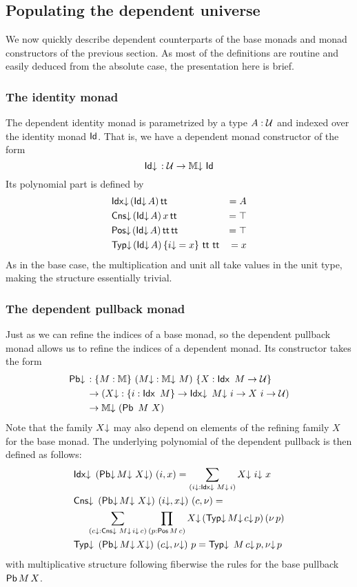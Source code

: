 \subsection{Populating the dependent universe}

We now quickly describe dependent counterparts of the base monads and
monad constructors of the previous section.  As most of the
definitions are routine and easily deduced from the absolute case, the
presentation here is brief.

\subsubsection{The identity monad}

The dependent identity monad is parametrized by a type $A : \mathcal{U}$ and
indexed over the identity monad $\mathsf{Id}$.  That is, we have a dependent
monad constructor of the form
\[
  \mathsf{Id{\downarrow}}\, : \mathcal{U} \to \mathbb{M{\downarrow}}\ \mathsf{Id} 
\]
Its polynomial part is defined by
\begin{align*}
  &\mathsf{Idx}{\downarrow}\, (\mathsf{Id{\downarrow}}\, A)\, \mathsf{tt} &= A\\
  &\mathsf{Cns}{\downarrow}\, (\mathsf{Id{\downarrow}}\, A)\, x\, \mathsf{tt} &= \top\\
  &\mathsf{Pos}{\downarrow}\, (\mathsf{Id{\downarrow}}\, A)\, \mathsf{tt}\, \mathsf{tt} &= \top\\
  &\mathsf{Typ}{\downarrow}\, (\mathsf{Id{\downarrow}}\, A)\, \{i{\downarrow} = x\}\ \mathsf{tt}\ \mathsf{tt} &= x
\end{align*}
As in the base case, the multiplication and unit all take values in
the unit type, making the structure essentially trivial.

\subsubsection{The dependent pullback monad}

Just as we can refine the indices of a base monad, so the dependent
pullback monad allows us to refine the indices of a dependent monad.
Its constructor takes the form
\begin{align*}
  \mathsf{Pb{\downarrow}}\, &: \{M : \mathbb{M}\}\ (M{\downarrow} : \mathbb{M{\downarrow}}\ M)\ \{X : \mathsf{Idx}\,\ M \to \mathcal{U}\}\\
       &\to (X{\downarrow} : \{i : \mathsf{Idx}\,\ M\} \to \mathsf{Idx}{\downarrow}\,\ M{\downarrow}\ i \to X\ i \to \mathcal{U})\\
       &\to \mathbb{M{\downarrow}}\ (\mathsf{Pb}\,\ M\ X)
\end{align*}
Note that the family $X{\downarrow}$ may also depend on elements of the
refining family $X$ for the base monad.  The underlying polynomial of
the dependent pullback is then defined as follows:
\begingroup
\addtolength{\jot}{1em}
\begin{align*}
  &\mathsf{Idx}{\downarrow}\,\ (\mathsf{Pb{\downarrow}}\, M{\downarrow}\ X{\downarrow})\ (i, x) = \sum_{(i{\downarrow} : \mathsf{Idx}{\downarrow}\,\, M{\downarrow}\, i)} X{\downarrow}\ i{\downarrow}\ x\\
  &\mathsf{Cns}{\downarrow}\,\ (\mathsf{Pb{\downarrow}}\, M{\downarrow}\ X{\downarrow})\ (i{\downarrow} , x{\downarrow})\ (c , \nu) =\\
  &\hspace{.5cm} \sum_{(c{\downarrow} : \mathsf{Cns}{\downarrow}\,\, M{\downarrow}\, i{\downarrow}\, c)} \prod_{(p : \mathsf{Pos}\, M\, c)} X{\downarrow}\, (\mathsf{Typ}{\downarrow}\, M{\downarrow}\, c{\downarrow}\, p)\, (\nu\, p) \\
  &\mathsf{Typ}{\downarrow}\,\ (\mathsf{Pb{\downarrow}}\, M{\downarrow}\, X{\downarrow})\ (c{\downarrow} , \nu{\downarrow})\ p = \mathsf{Typ}{\downarrow}\,\ M\, c{\downarrow}\, p, \nu{\downarrow}\, p
\end{align*}
\endgroup with multiplicative structure following fiberwise the rules
for the base pullback $\mathsf{Pb}\, M\, X$.

